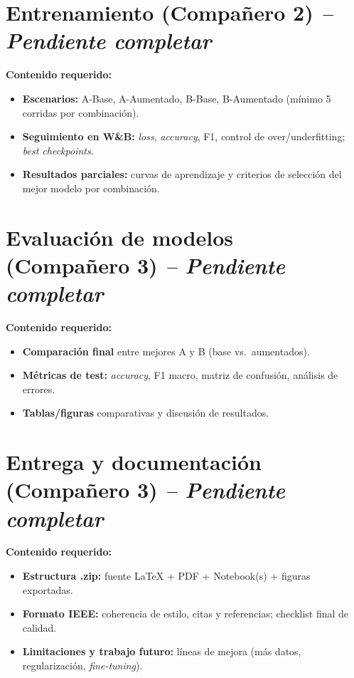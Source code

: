 \documentclass[conference]{IEEEtran}
\begin{document}
\section{Entrenamiento (Compañero 2) \textit{-- Pendiente completar}}
\noindent\textbf{Contenido requerido:}
\begin{itemize}
    \item \textbf{Escenarios:} A-Base, A-Aumentado, B-Base, B-Aumentado (mínimo 5 corridas por combinación).
    \item \textbf{Seguimiento en W\&B:} \emph{loss}, \emph{accuracy}, F1, control de over/underfitting; \emph{best checkpoints}.
    \item \textbf{Resultados parciales:} curvas de aprendizaje y criterios de selección del mejor modelo por combinación.
\end{itemize}

\section{Evaluación de modelos (Compañero 3) \textit{-- Pendiente completar}}
\noindent\textbf{Contenido requerido:}
\begin{itemize}
    \item \textbf{Comparación final} entre mejores A y B (base vs.\ aumentados).
    \item \textbf{Métricas de test:} \emph{accuracy}, F1 macro, matriz de confusión, análisis de errores.
    \item \textbf{Tablas/figuras} comparativas y discusión de resultados.
\end{itemize}

\section{Entrega y documentación (Compañero 3) \textit{-- Pendiente completar}}
\noindent\textbf{Contenido requerido:}
\begin{itemize}
    \item \textbf{Estructura .zip:} fuente LaTeX + PDF + Notebook(s) + figuras exportadas.
    \item \textbf{Formato IEEE:} coherencia de estilo, citas y referencias; checklist final de calidad.
    \item \textbf{Limitaciones y trabajo futuro:} líneas de mejora (más datos, regularización, \emph{fine-tuning}).
\end{itemize}
\end{document}
